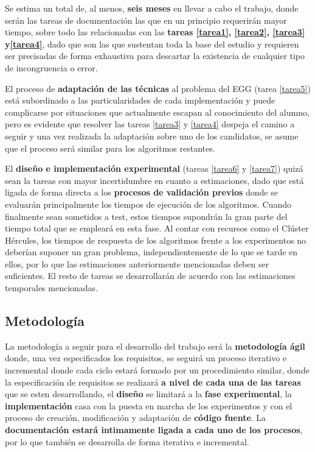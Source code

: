Se estima un total de, al menos, \textbf{seis meses} en llevar a cabo el trabajo, donde serán las tareas de documentación las que en un principio requerirán mayor tiempo, sobre todo las relacionadas con las \textbf{tareas \ref{tarea1}, \ref{tarea2}, \ref{tarea3} y\ref{tarea4}}, dado que son las que sustentan toda la base del estudio y requieren ser precisadas de forma exhaustiva para descartar la existencia de cualquier tipo de incongruencia o error.

El proceso de \textbf{adaptación de las técnicas} al problema del EGG (tarea \ref{tarea5}) está subordinado a las particularidades de cada implementación y puede complicarse por situaciones que actualmente escapan al conocimiento del alumno, pero es evidente que resolver las tareas \ref{tarea3} y \ref{tarea4} despeja el camino a seguir y una vez realizada la adaptación sobre uno de los candidatos, se asume que el proceso será similar para los algoritmos restantes. 

El \textbf{diseño e implementación experimental} (tareas \ref{tarea6} y \ref{tarea7}) quizá sean la tareas con mayor incertidumbre en cuanto a estimaciones, dado que está ligada de forma directa a los \textbf{procesos de validación previos} donde se evaluarán principalmente los tiempos de ejecución de los algoritmos. Cuando finalmente sean sometidos a test, estos tiempos supondrán la gran parte del tiempo total que se empleará en esta fase. Al contar con recursos como el Clúster Hércules, los tiempos de respuesta de los algoritmos frente a los experimentos no deberían suponer un gran problema, independientemente de lo que se tarde en ellos, por lo que las estimaciones anteriormente mencionadas deben ser suficientes. El resto de tareas se desarrollarán de acuerdo con las estimaciones temporales mencionadas.

\subsection{Metodología}

La metodología a seguir para el desarrollo del trabajo será la \textbf{metodología ágil} donde, una vez especificados los requisitos, se seguirá un proceso iterativo e incremental donde cada ciclo estará formado por un procedimiento similar, donde la especificación de requisitos se realizará \textbf{a nivel de cada una de las tareas} que se esten desarrollando, el \textbf{diseño} se limitará a la \textbf{fase experimental}, la \textbf{implementación} casa con la puesta en marcha de los experimentos y con el proceso de creación, modificación y adaptación de \textbf{código fuente}. La \textbf{documentación estará intimamente ligada a cada uno de los procesos}, por lo que también se desarrolla de forma iterativa e incremental.

